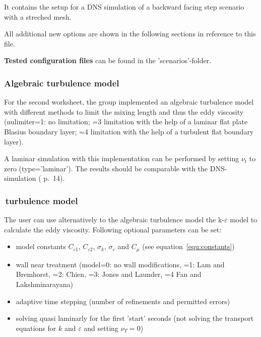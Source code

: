 \noii It contains the setup for a DNS simulation of a backward facing step scenario with a streched mesh.


\noii All additional new options are shown in the following sections in reference to this file.

\noii \textbf{Tested configuration files} can be found in the 'scenarios'-folder.

\newpage
\subsubsection*{Algebraic turbulence model}

For the second worksheet, the group implemented an algebraic turbulence model with different methods to limit the mixing length and thus the eddy viscosity (nulimiter=1: no limitation; =3 limitation with the help of a laminar flat plate Blasius boundary layer; =4 limitation with the help of a turbulent flat boundary layer). 


\noii A laminar simulation with this implementation can be performed by setting $\nu_t$ to zero (type='laminar'). The results should be comparable with the DNS-simulation (\citep{lienen2015} p.~14).  

\subsubsection*{\ke\,turbulence model}

The user can use alternatively to the algebraic turbulence model the k-$\varepsilon$ model to calculate the eddy viscosity. Following optional parameters can be set:
\begin{itemize}
\item model constants $C_{\varepsilon 1}$, $C_{\varepsilon 2}$, $\sigma_k$, $\sigma_\varepsilon$ and $C_{\mu}$ (see equation~\ref{equ:constants})
\item wall near treatment (model=0: no wall modifications, =1: Lam and Bremhorst, =2: Chien, =3: Jones and Launder, =4 Fan and Lakshminarayana)
\item adaptive time stepping (number of refinements and permitted errors)
\item solving quasi laminarly for the first 'start' seconds (not solving the transport equations for $k$ and $\varepsilon$ and setting $\nu_T=0$)
\end{itemize}

